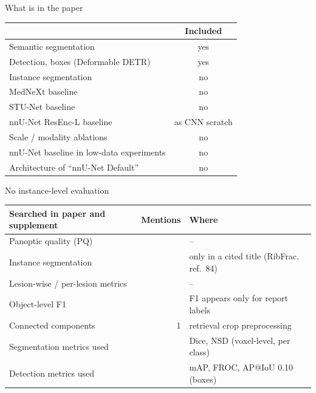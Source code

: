 \documentclass[aspectratio=169,11pt]{beamer}
\newcommand{\best}[1]{{\interbold #1}}
\begin{document}
\begin{frame}{What is in the paper}
\vskip14pt
\begin{tabular}{@{}l c@{}}
\toprule
 & Included \\
\midrule
Semantic segmentation & \textcolor{cnn}{\best{yes}} \\
Detection, boxes (Deformable DETR) & \textcolor{cnn}{\best{yes}} \\
Instance segmentation & \textcolor{unet}{no} \\
MedNeXt baseline & \textcolor{unet}{no} \\
STU-Net baseline & \textcolor{unet}{no} \\
nnU-Net ResEnc-L baseline & \textcolor{cnn}{as CNN scratch} \\
Scale / modality ablations & \textcolor{unet}{no} \\
nnU-Net baseline in low-data experiments & \textcolor{unet}{no} \\
Architecture of ``nnU-Net Default'' & \textcolor{unet}{no} \\
\bottomrule
\end{tabular}
\end{frame}
\begin{frame}{No instance-level evaluation}
\vskip10pt
{\small
\begin{tabular}{@{}l r l@{}}
\toprule
Searched in paper and supplement & Mentions & Where \\
\midrule
Panoptic quality (PQ) & \best{0} & -- \\
Instance segmentation & \best{0} & only in a cited title (RibFrac, ref.\ 84) \\
Lesion-wise / per-lesion metrics & \best{0} & -- \\
Object-level F1 & \best{0} & F1 appears only for report labels \\
Connected components & 1 & retrieval crop preprocessing \\
\midrule
Segmentation metrics used & & Dice, NSD (voxel-level, per class) \\
Detection metrics used & & mAP, FROC, AP@IoU 0.10 (boxes) \\
\bottomrule
\end{tabular}}
\end{frame}
\end{document}
